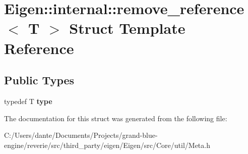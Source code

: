 \hypertarget{struct_eigen_1_1internal_1_1remove__reference}{}\section{Eigen\+::internal\+::remove\+\_\+reference$<$ T $>$ Struct Template Reference}
\label{struct_eigen_1_1internal_1_1remove__reference}
\subsection*{Public Types}
\begin{DoxyCompactItemize}
\item 
\mbox{\label{struct_eigen_1_1internal_1_1remove__reference_a48fc595958f2006d8ddea90f18833ae0}} 
typedef T {\bfseries type}
\end{DoxyCompactItemize}


The documentation for this struct was generated from the following file\+:\begin{DoxyCompactItemize}
\item 
C\+:/\+Users/dante/\+Documents/\+Projects/grand-\/blue-\/engine/reverie/src/third\+\_\+party/eigen/\+Eigen/src/\+Core/util/Meta.\+h\end{DoxyCompactItemize}
